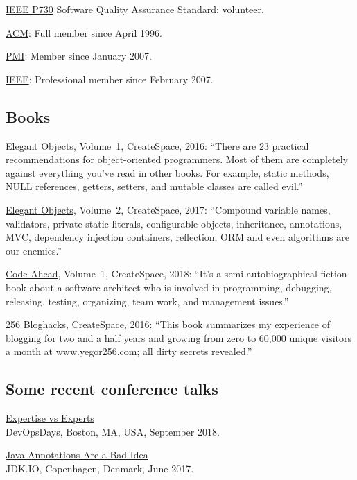 \documentclass[12pt]{article}
\begin{document}
\href{http://ieeexplore.ieee.org/document/6835311/}{IEEE P730} Software Quality Assurance Standard: volunteer.

\href{https://www.acm.org}{ACM}: Full member since April 1996.

\href{https://certification.pmi.org/registry.aspx}{PMI}: Member since January 2007.

\href{https://www.ieee.org}{IEEE}: Professional member since February 2007.

\subsection*{Books}

\href{https://amzn.to/2E5UHqZ}{Elegant Objects}, Volume~1, CreateSpace, 2016:
``There are 23 practical recommendations for object-oriented programmers. Most of them are completely
against everything you've read in other books.
For example, static methods, NULL references, getters, setters, and
mutable classes are called evil.''

\href{https://amzn.to/2J2s5T4}{Elegant Objects}, Volume~2, CreateSpace, 2017:
``Compound variable names, validators, private static literals, configurable objects, inheritance,
annotations, MVC, dependency injection containers, reflection, ORM and even algorithms are our enemies.''

\href{https://amzn.to/2u9BbqF}{Code Ahead}, Volume~1, CreateSpace, 2018:
``It's a semi-autobiographical fiction book about a software architect
who is involved in programming, debugging, releasing, testing,
organizing, team work, and management issues.''

\href{https://amzn.to/2GkuyXf}{256 Bloghacks}, CreateSpace, 2016:
``This book summarizes my experience of blogging for two and a half years and growing from zero to 60,000
unique visitors a month at www.yegor256.com; all dirty secrets revealed.''

\subsection*{Some recent conference talks}

\href{https://youtu.be/KCx1o_lSMkI}{Expertise vs Experts}\\
DevOpsDays, Boston, MA, USA, September 2018.

\href{https://youtu.be/cv23Z6xpwDw}{Java Annotations Are a Bad Idea}\\
JDK.IO, Copenhagen, Denmark, June 2017.
\end{document}
